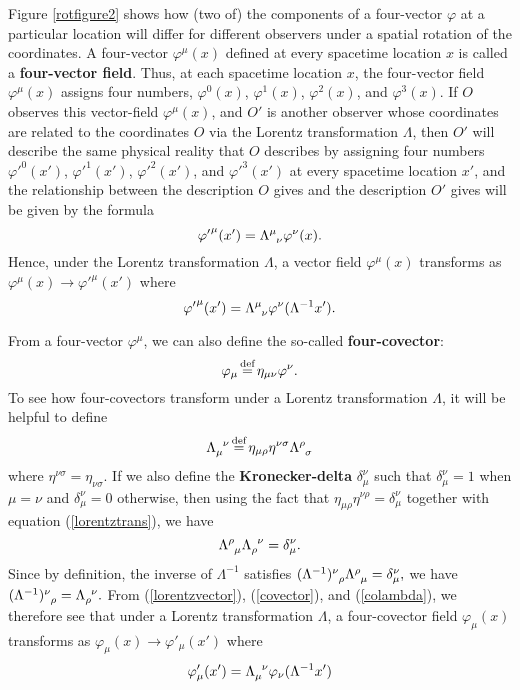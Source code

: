 	Figure \ref{rotfigure2} shows how (two of) the components of a four-vector $\varphi$ at a particular location will differ for different observers under a spatial rotation of the coordinates. A four-vector $\varphi^\mu(x)$ defined at every spacetime location $x$ is called a \textbf{four-vector field}. Thus,  at each spacetime location $x$, the four-vector field $\varphi^\mu(x)$ assigns four numbers, $\varphi^0(x)$, $\varphi^1(x)$, $\varphi^2(x)$, and $\varphi^3(x)$. If $O$ observes this vector-field $\varphi^\mu(x)$, and $O'$ is another observer whose coordinates are related to the coordinates $O$ via the Lorentz transformation $\Lambda$, then $O'$ will describe the same physical reality that $O$ describes by assigning four numbers ${\varphi'}^0(x')$, ${\varphi'}^1(x')$, ${\varphi'}^2(x')$, and ${\varphi'}^3(x')$ at every spacetime location $x'$, and the relationship between the description $O$ gives and the  description $O'$ gives will be given by the formula
	$${\varphi'}^\mu(x')=\Lambda\indices{^\mu_\nu}\varphi^\nu(x).$$
	Hence, under the Lorentz transformation $\Lambda$,  a vector field $\varphi^\mu(x)$ transforms as ${\varphi}^\mu(x)\rightarrow {\varphi'}^\mu(x')$ where
	\begin{equation}\label{lorentzvector}
	{\varphi'}^\mu(x')=\Lambda\indices{^\mu_\nu}\varphi^\nu(\Lambda^{-1}x').
	\end{equation} 



From a four-vector $\varphi^\mu$, we can also define the so-called \textbf{four-covector}: 
\begin{equation}\label{covector}
	\varphi_\mu\myeq\eta_{\mu\nu}\varphi^\nu.
\end{equation}
To see how four-covectors transform under a Lorentz transformation $\Lambda$, it will be helpful to define 
\begin{equation}\label{colambda}
	\Lambda\indices{_\mu^\nu}\myeq\eta_{\mu\rho}\eta^{\nu\sigma}\Lambda\indices{^\rho_\sigma}
\end{equation}
where $\eta^{\nu\sigma}=\eta_{\nu\sigma}$. If we also define the \textbf{Kronecker-delta} $\delta^\nu_\mu$ such that $\delta^\nu_\mu=1$ when $\mu=\nu$ and $\delta^\nu_\mu=0$ otherwise, then using the fact that $\eta_{\mu\rho}\eta^{\nu\rho}=\delta^\nu_\mu$ together with equation (\ref{lorentztrans}), we have 
\begin{equation}\label{lambdainverse}
\Lambda\indices{^\rho_\mu}\Lambda\indices{_\rho^\nu}=\delta^\nu_\mu.
\end{equation}
Since by definition, the inverse of $\Lambda^{-1}$ satisfies 
$(\Lambda^{-1})\indices{^\nu_\rho}\Lambda\indices{^\rho_\mu}=\delta^\nu_\mu,$
 we have $(\Lambda^{-1})\indices{^\nu_\rho}=\Lambda\indices{_\rho^\nu}.$  From (\ref{lorentzvector}), (\ref{covector}), and (\ref{colambda}), we therefore see that under a Lorentz transformation $\Lambda$, a four-covector field $\varphi_\mu(x)$ transforms as $\varphi_\mu(x)\rightarrow\varphi'_\mu(x')$
where
\begin{equation}\label{lorentzcovector}
\varphi'_\mu(x')=\Lambda\indices{_\mu^\nu}\varphi_\nu(\Lambda^{-1}x')
\end{equation}
 

